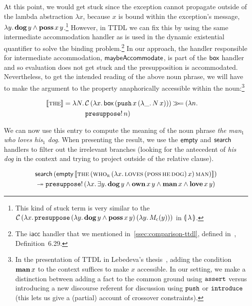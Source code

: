 At this point, we would get stuck since the exception cannot propagate
outside of the lambda abstraction $\lambda x$, because $x$ is bound within
the exception's message,
$\lambda y.\, \textbf{dog}\,y \land \textbf{poss}\,x\,y$.\footnote{This
  kind of stuck term is very similar to the
  $\mathcal{C}\,(\lambda x.\, \mathtt{presuppose}\,(\lambda y.\, \textbf{dog}\,y \land
          \textbf{poss}\,x\,y)\,(\lambda y.\, M_{\mathrm{c}}(y)))$ in
  ${\llparenthesis \, \lambda \, \rrparenthesis}$.} However, in TTDL we can fix this by using the same intermediate
accommodation handler as is used in the dynamic existential quantifier to
solve the binding problem.\footnote{The $\textsf{iacc}$ handler that we
  mentioned in~\ref{ssec:comparison-ttdl}, defined
  in~\cite{lebedeva2012expression}, Definition~6.29.} In our approach, the
handler responsible for intermediate accommodation, $\textsf{maybeAccommodate}$, is
part of the $\textsf{box}$ handler and so evaluation does not get stuck and the
presupposition is accommodated. Nevertheless, to get the intended reading
of the above noun phrase, we will have to make the argument to the property
anaphorically accessible within the noun:\footnote{In the presentation of
  TTDL in Lebedeva's thesis~\cite{lebedeva2012expression}, adding the
  condition $\textbf{man}\,x$ to the context suffices to make $x$
  accessible. In our setting, we make a distinction between adding a fact
  to the common ground using $\mathtt{assert}$ versus introducing a new
  discourse referent for discussion using $\mathtt{push}$ or $\mathtt{introduce}$
  (this lets us give a (partial) account of crossover constraints).}

\begin{align*}
  \llbracket \textsc{the} \rrbracket &= \lambda N.\, \begin{aligned}[t]
      &\mathcal{C}\,(\lambda x.\, \textsf{box}\,(\mathtt{push}\,x\,(\lambda \_.\, N\,x))) \mathbin{\gg\!=} (\lambda n.\,  \\
      &\mathtt{presuppose}!\,n)
    \end{aligned}
\end{align*}

We can now use this entry to compute the meaning of the noun phrase
\emph{the man$_1$ who loves his$_1$ dog}. When presenting the result, we
use the $\textsf{empty}$ and $\textsf{search}$ handlers to filter out the irrelevant
branches (looking for the antecedent of \emph{his dog} in the context and
trying to project outside of the relative clause).

\begin{align*}
& \textsf{search}\,(\textsf{empty}\,\llbracket \textsc{the}\,(\textsc{who}_{\textsc{r}}\,(\lambda x.\, \textsc{loves}\,(\textsc{poss}\,\textsc{he}\,\textsc{dog})\,x)\,\textsc{man}) \rrbracket) \\
& \twoheadrightarrow \mathtt{presuppose}!\,(\lambda x.\, \exists y.\, \textbf{dog}\,y \land
  \textbf{own}\,x\,y \land \textbf{man}\,x \land \textbf{love}\,x\,y)
\end{align*}

